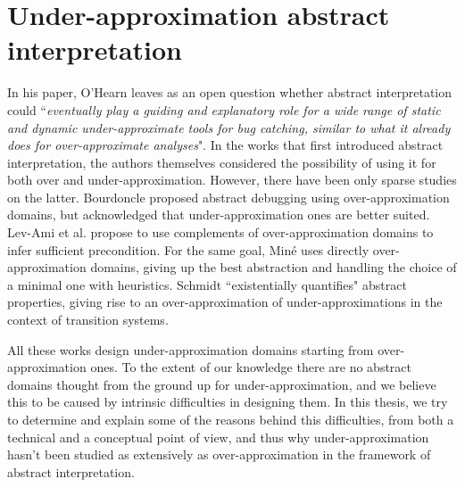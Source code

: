 \section{Under-approximation abstract interpretation}
In his paper, O'Hearn leaves as an open question whether abstract interpretation could ``\textit{eventually play a guiding and explanatory role for a wide range of static and dynamic under-approximate tools for bug catching, similar to what it already does for over-approximate analyses}".
In the works that first introduced abstract interpretation, the authors themselves considered the possibility of using it for both over and under-approximation. However, there have been only sparse studies on the latter.
Bourdoncle \cite{bourdoncle-abs-debugging} proposed abstract debugging using over-approximation domains, but acknowledged that under-approximation ones are better suited.
Lev-Ami et al. \cite{lev-backward-analysis-complement} propose to use complements of over-approximation domains to infer sufficient precondition.
For the same goal, Miné \cite{mine-backward-underapprox-14} uses directly over-approximation domains, giving up the best abstraction and handling the choice of a minimal one with heuristics.
Schmidt \cite{schmidt-higher-order-approx-2007} ``existentially quantifies" abstract properties, giving rise to an over-approximation of under-approximations in the context of transition systems.

All these works design under-approximation domains starting from over-approximation ones. To the extent of our knowledge there are no abstract domains thought from the ground up for under-approximation, and we believe this to be caused by intrinsic difficulties in designing them. In this thesis, we try to determine and explain some of the reasons behind this difficulties, from both a technical and a conceptual point of view, and thus why under-approximation hasn't been studied as extensively as over-approximation in the framework of abstract interpretation.

